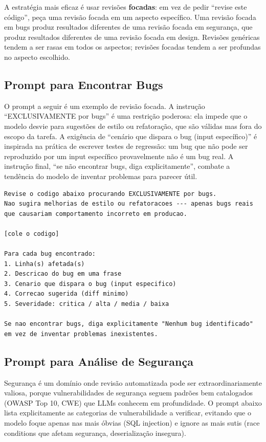 A estratégia mais eficaz é usar revisões \textbf{focadas}: em vez de pedir
``revise este código'', peça uma revisão focada em um aspecto específico. Uma
revisão focada em bugs produz resultados diferentes de uma revisão focada em
segurança, que produz resultados diferentes de uma revisão focada em design.
Revisões genéricas tendem a ser rasas em todos os aspectos; revisões focadas
tendem a ser profundas no aspecto escolhido.

\subsection{Prompt para Encontrar Bugs}

O prompt a seguir é um exemplo de revisão focada. A instrução ``EXCLUSIVAMENTE por
bugs'' é uma restrição poderosa: ela impede que o modelo desvie para sugestões de
estilo ou refatoração, que são válidas mas fora do escopo da tarefa. A exigência
de ``cenário que dispara o bug (input específico)'' é inspirada na prática de
escrever testes de regressão: um bug que não pode ser reproduzido por um input
específico provavelmente não é um bug real. A instrução final, ``se não
encontrar bugs, diga explicitamente'', combate a tendência do modelo de
inventar problemas para parecer útil.

\begin{lstlisting}[language={}, caption={Prompt para análise de bugs}]
Revise o codigo abaixo procurando EXCLUSIVAMENTE por bugs.
Nao sugira melhorias de estilo ou refatoracoes --- apenas bugs reais
que causariam comportamento incorreto em producao.

[cole o codigo]

Para cada bug encontrado:
1. Linha(s) afetada(s)
2. Descricao do bug em uma frase
3. Cenario que dispara o bug (input especifico)
4. Correcao sugerida (diff minimo)
5. Severidade: critica / alta / media / baixa

Se nao encontrar bugs, diga explicitamente "Nenhum bug identificado"
em vez de inventar problemas inexistentes.
\end{lstlisting}

\subsection{Prompt para Análise de Segurança}

Segurança é um domínio onde revisão automatizada pode ser extraordinariamente
valiosa, porque vulnerabilidades de segurança seguem padrões bem catalogados
(OWASP Top 10, CWE) que LLMs conhecem em profundidade. O prompt abaixo lista
explicitamente as categorias de vulnerabilidade a verificar, evitando que o
modelo foque apenas nas mais óbvias (SQL injection) e ignore as mais sutis
(race conditions que afetam segurança, deserialização insegura).


